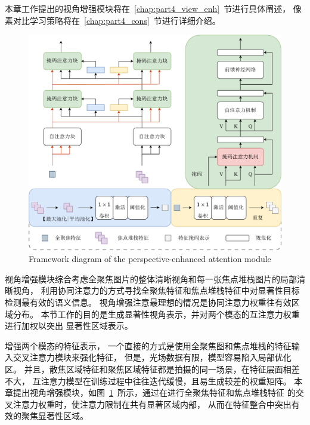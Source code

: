 本章工作提出的视角增强模块将在~\ref{chap:part4_view_enh}~节进行具体阐述，
像素对比学习策略将在~\ref{chap:part4_cons}~节进行详细介绍。









\label{chap:part4_view_enh}


\begin{figure}[!ht]
	\centering
	\includegraphics[width=0.95\linewidth]{figures/chapter4/view_enhance}
	{Framework diagram of the perspective-enhanced attention module}
	\label{cpt4_fig1:view_enhance}
\end{figure}



视角增强模块综合考虑全聚焦图片的整体清晰视角和每一张焦点堆栈图片的局部清晰视角，
利用协同注意力的方式寻找全聚焦特征和焦点堆栈特征中对显著性目标检测最有效的语义信息。
视角增强注意最理想的情况是协同注意力权重往有效区域分布。
本节工作的目的是生成显著性视角表示，并对两个模态的互注意力权重进行加权以突出
显著性区域表示。


增强两个模态的特征表示，
一个直接的方式是使用全聚焦图和焦点堆栈的特征输入交叉注意力模块来强化特征，
但是，光场数据有限，模型容易陷入局部优化区。
并且，散焦区域特征和聚焦区域特征都是拍摄的同一场景，在特征层面相差不大，
互注意力模型在训练过程中往往迭代缓慢，且易生成较差的权重矩阵。
本章提出视角增强模块，如图~\ref{cpt4_fig1:view_enhance}~所示，通过在进行全聚焦特征和焦点堆栈特征
的交叉注意力权重时，使注意力限制在共有显著区域内部，
从而在特征整合中突出有效的聚焦显著性区域。


